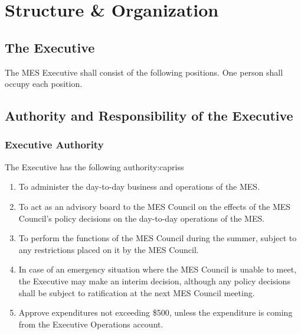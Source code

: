 \section{Structure \& Organization}
\label{structure-organization}

\subsection{The Executive}
\label{the-executive}

The MES Executive shall consist of the following positions. One person shall occupy each position.









\subsection{Authority and Responsibility of the Executive}
\label{authority-and-responsibility-of-the-executive}
\subsubsection{Executive Authority}
\label{executive-authority}

The Executive has the following authority:capriss

\begin{enumerate}
 \item
  To administer the day-to-day business and operations of the MES.
 \item
  To act as an advisory board to the MES Council on the effects of the MES Council's policy decisions on the day-to-day operations of the MES.
 \item
  To perform the functions of the MES Council during the summer, subject to any restrictions placed on it by the MES Council.
 \item
  In case of an emergency situation where the MES Council is unable to meet, the Executive may make an interim decision, although any policy decisions shall be subject to ratification at the next MES Council meeting.
 \item
  Approve expenditures not exceeding \$500, unless the expenditure is coming from the Executive Operations account.

\end{enumerate}

